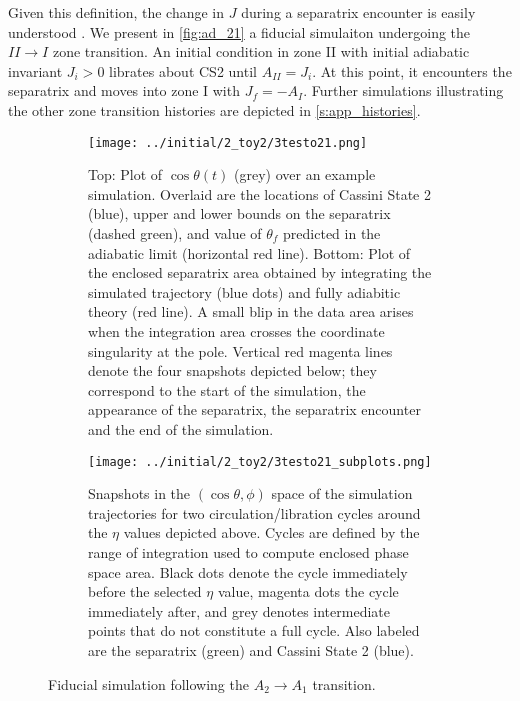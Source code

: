 \documentclass[
        fleqn,
        usenatbib,
    ]{mnras}
\newcommand*{\p}[1]{\left(#1\right)}
\begin{document}
Given this definition, the change in $J$ during a separatrix encounter is easily
understood \citep{henrard1982}. We present in \autoref{fig:ad_21} a fiducial
simulaiton undergoing the $II \to I$ zone transition. An initial condition in
zone II with initial adiabatic invariant $J_i > 0$ librates about CS2 until
$A_{II} = J_i$. At this point, it encounters the separatrix and moves into zone I
with $J_f = -A_I$. Further simulations illustrating the other zone transition
histories are depicted in \autoref{s:app_histories}.
\begin{figure}
    \centering
    \begin{subfigure}{\columnwidth}
        \centering
        \texttt{[image: ../initial/2\_toy2/3testo21.png]}
        \caption{Top: Plot of $\cos \theta(t)$ (grey) over an example
        simulation. Overlaid are the locations of Cassini State 2 (blue), upper
        and lower bounds on the separatrix (dashed green), and value of
        $\theta_{f}$ predicted in the adiabatic limit (horizontal red line).
        Bottom: Plot of the enclosed separatrix area obtained by integrating the
        simulated trajectory (blue dots) and fully adiabitic theory (red line).
        A small blip in the data area arises when the integration area crosses
        the coordinate singularity at the pole. Vertical red magenta lines
        denote the four snapshots depicted below; they correspond to the start
        of the simulation, the appearance of the separatrix, the separatrix
        encounter and the end of the simulation.}
    \end{subfigure}
    \begin{subfigure}{\columnwidth}
        \centering
        \texttt{[image: ../initial/2\_toy2/3testo21\_subplots.png]}
        \caption{Snapshots in the $\p{\cos \theta, \phi}$ space of the
        simulation trajectories for two circulation/libration cycles around the
        $\eta$ values depicted above. Cycles are defined by the range of
        integration used to compute enclosed phase space area. Black dots denote
        the cycle immediately before the selected $\eta$ value, magenta dots the
        cycle immediately after, and grey denotes intermediate points that do
        not constitute a full cycle. Also labeled are the separatrix (green) and
        Cassini State 2 (blue).}
    \end{subfigure}
    \caption{Fiducial simulation following the $A_2 \to A_1$
    transition.}\label{fig:ad_21}
\end{figure}
\end{document}
